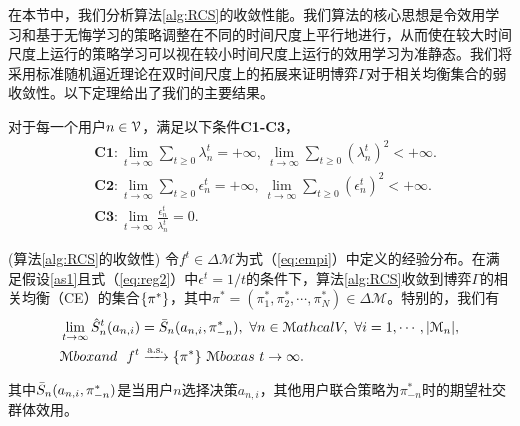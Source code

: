 在本节中，我们分析算法\ref{alg:RCS}的收敛性能。我们算法的核心思想是令效用学习和基于无悔学习的策略调整在不同的时间尺度上平行地进行，从而使在较大时间尺度上运行的策略学习可以视在较小时间尺度上运行的效用学习为准静态。我们将采用标准随机逼近理论在双时间尺度上的拓展来证明博弈$\Gamma$对于相关均衡集合的弱收敛性。以下定理给出了我们的主要结果。
\begin{as}\label{as1}
对于每一个用户$n\in\mathcal{V}$，满足以下条件\textbf{C1-C3}，
\vspace{-0.2cm}
\begin{align}
&\textbf{C1}:\lim_{t\rightarrow\infty}\sum_{t\geq0}\lambda^t_n=+\infty,~\lim_{t\rightarrow\infty}\sum_{t\geq0}(\lambda^t_n)^2<+\infty.\\
&\textbf{C2}:\lim_{t\rightarrow\infty}\sum_{t\geq0}\epsilon^t_n=+\infty,~\lim_{t\rightarrow\infty}\sum_{t\geq0}(\epsilon^t_n)^2<+\infty.\\
&\textbf{C3}:\lim_{t\rightarrow\infty}\frac{\epsilon^t_n}{\lambda^t_n}=0.
\end{align}
\end{as}
\vspace{-0.3cm}
\begin{thm}(算法\ref{alg:RCS}的收敛性)\label{thm:conv}
令$f^t\in\Delta\mathcal{M}$为式（\ref{eq:empi}）中定义的经验分布。在满足假设\ref{as1}且式（\ref{eq:reg2}）中$\epsilon^t=1/t$的条件下，算法\ref{alg:RCS}收敛到博弈$\Gamma$的相关均衡（CE）的集合$\{\pi^*\}$，其中$\pi^*=(\pi^*_1,\pi^*_2,\cdots,\pi^*_N)\in\Delta\mathcal{M}$。特别的，我们有
\begin{align}\label{sne}
&\lim_{t\rightarrow\infty}\hat{S}^t_n(a_{n,i})=\bar{S}_n(a_{n,i},\pi^*_{-n}),~\forall n\in\mathcal{M}athcal{V},~\forall i=1,\cdots,|\mathcal{M}_n|,\\
&\mathcal{M}box{and}~~f^t\xrightarrow[\text{}]{\text{a.s.}}\{\pi^*\}~\mathcal{M}box{as}~t\rightarrow\infty.
\end{align}
其中$\bar{S}_n(a_{n,i},\pi^*_{-n})$是当用户$n$选择决策$a_{n,i}$，其他用户联合策略为$\pi^*_{-n}$时的期望社交群体效用。
\end{thm}

